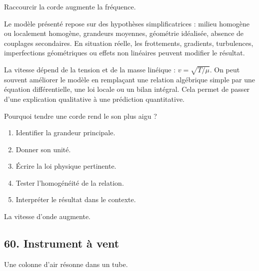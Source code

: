 \documentclass[11pt,a4paper]{article}
\begin{document}
\begin{odgbox}
Raccourcir la corde augmente la fréquence.
\end{odgbox}

\begin{attentionbox}
Le modèle présenté repose sur des hypothèses simplificatrices : milieu homogène ou localement homogène, grandeurs moyennes, géométrie idéalisée, absence de couplages secondaires. En situation réelle, les frottements, gradients, turbulences, imperfections géométriques ou effets non linéaires peuvent modifier le résultat.
\end{attentionbox}

\begin{approfondissementbox}
La vitesse dépend de la tension et de la masse linéique : $v=\sqrt{T/\mu}$.
On peut souvent améliorer le modèle en remplaçant une relation algébrique simple par une équation différentielle, une loi locale ou un bilan intégral. Cela permet de passer d'une explication qualitative à une prédiction quantitative.
\end{approfondissementbox}

\begin{exercicebox}
Pourquoi tendre une corde rend le son plus aigu ?
\begin{enumerate}
  \item Identifier la grandeur principale.
  \item Donner son unité.
  \item Écrire la loi physique pertinente.
  \item Tester l'homogénéité de la relation.
  \item Interpréter le résultat dans le contexte.
\end{enumerate}
\end{exercicebox}

\begin{corrigebox}[Indication]
La vitesse d'onde augmente.
\end{corrigebox}


\subsection{60. Instrument à vent}

\begin{exemplebox}
Une colonne d'air résonne dans un tube.
\end{exemplebox}
\end{document}
